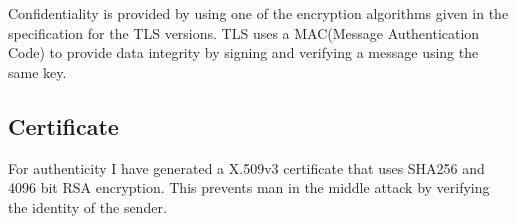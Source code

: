 \documentclass{article}
\begin{document}
Confidentiality is provided by using one of the encryption algorithms given in the specification for the TLS versions.
TLS uses a MAC(Message Authentication Code) to provide data integrity by signing and verifying a message using the same key.

\subsection{Certificate}
For authenticity I have generated a X.509v3 certificate that uses SHA256 and 4096 bit RSA encryption.
This prevents man in the middle attack by verifying the identity of the sender.

  
\end{document}
